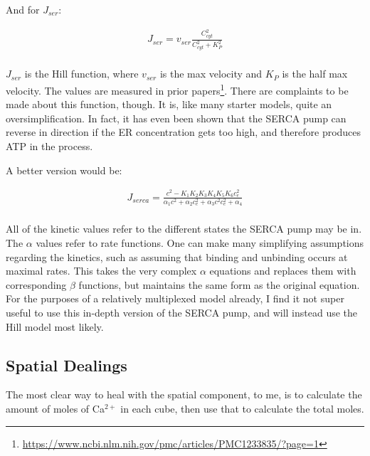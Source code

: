 \documentclass[12pt]{amsart}
\begin{document}
\bigskip

And for $J_{ser}$:

\bigskip

\begin{equation} \label{eq8}
\begin{split}
J_{ser} = v_{ser}\frac{C^2_{cyt}}{C^2_{cyt} + K^2_P}\\
\end{split}
\end{equation}

\bigskip

 $J_{ser}$ is the Hill function, where $v_{ser}$ is the max velocity and $K_P$ is the half max velocity. The values are measured in prior papers\footnote{\url{https://www.ncbi.nlm.nih.gov/pmc/articles/PMC1233835/?page=1}}. There are complaints to be made about this function, though. It is, like many starter models, quite an oversimplification. In fact, it has even been shown that the SERCA pump can reverse in direction if the ER concentration gets too high, and therefore produces ATP in the process. \newline

 A better version would be: 

 \bigskip

\begin{equation} \label{eq8}
\begin{split}
J_{serca} = \frac{c^2 - K_1K_2K_3K_4K_5K_6c_e^2}{\alpha_1c^2 + \alpha_2c_e^2 + \alpha_3c^2c^2_e + \alpha_4}\\
\end{split}
\end{equation}

 \bigskip

 All of the kinetic values refer to the different states the SERCA pump may be in. The $\alpha$ values refer to rate functions. One can make many simplifying assumptions regarding the kinetics, such as assuming that binding and unbinding occurs at maximal rates. This takes the very complex $\alpha$ equations and replaces them with corresponding $\beta$ functions, but maintains the same form as the original equation. For the purposes of a relatively multiplexed model already, I find it not super useful to use this in-depth version of the SERCA pump, and will instead use the Hill model most likely.

 
\subsection{Spatial Dealings} The most clear way to heal with the spatial component, to me, is to calculate the amount of moles of Ca$^{2+}$ in each cube, then use that to calculate the total moles.\newline
\end{document}
